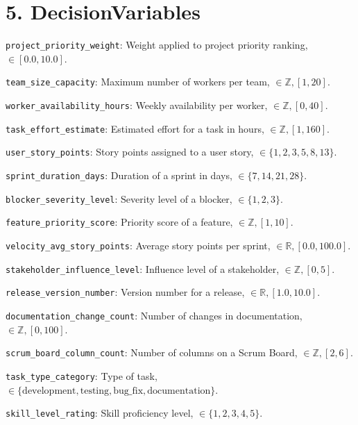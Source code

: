 \documentclass[12pt]{article}
\begin{document}
\section{5. DecisionVariables}
\item \texttt{project\_priority\_weight}: Weight applied to project priority ranking, $ \in [0.0, 10.0] $.
    \item \texttt{team\_size\_capacity}: Maximum number of workers per team, $ \in \mathbb{Z}, [1, 20] $.
    \item \texttt{worker\_availability\_hours}: Weekly availability per worker, $ \in \mathbb{Z}, [0, 40] $.
    \item \texttt{task\_effort\_estimate}: Estimated effort for a task in hours, $ \in \mathbb{Z}, [1, 160] $.
    \item \texttt{user\_story\_points}: Story points assigned to a user story, $ \in \{1, 2, 3, 5, 8, 13\} $.
    \item \texttt{sprint\_duration\_days}: Duration of a sprint in days, $ \in \{7, 14, 21, 28\} $.
    \item \texttt{blocker\_severity\_level}: Severity level of a blocker, $ \in \{1, 2, 3\} $.
    \item \texttt{feature\_priority\_score}: Priority score of a feature, $ \in \mathbb{Z}, [1, 10] $.
    \item \texttt{velocity\_avg\_story\_points}: Average story points per sprint, $ \in \mathbb{R}, [0.0, 100.0] $.
    \item \texttt{stakeholder\_influence\_level}: Influence level of a stakeholder, $ \in \mathbb{Z}, [0, 5] $.
    \item \texttt{release\_version\_number}: Version number for a release, $ \in \mathbb{R}, [1.0, 10.0] $.
    \item \texttt{documentation\_change\_count}: Number of changes in documentation, $ \in \mathbb{Z}, [0, 100] $.
    \item \texttt{scrum\_board\_column\_count}: Number of columns on a Scrum Board, $ \in \mathbb{Z}, [2, 6] $.
    \item \texttt{task\_type\_category}: Type of task, $ \in \{\text{development}, \text{testing}, \text{bug\_fix}, \text{documentation}\} $.
    \item \texttt{skill\_level\_rating}: Skill proficiency level, $ \in \{1, 2, 3, 4, 5\} $.
\end{document}
